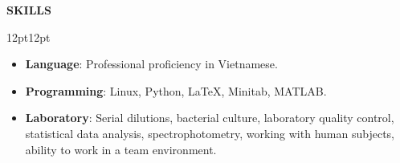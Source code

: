 \documentclass{resumeDaniNguyen}
\begin{document}
\textbf{\large SKILLS} \xrfill[3pt]{1pt} \\[-6pt]
\begin{adjustwidth}{12pt}{12pt}
    \begin{itemize}
        \item \textbf{Language}: Professional proficiency in Vietnamese.
        \item \textbf{Programming}: Linux, Python, LaTeX, Minitab, MATLAB.
        \item \textbf{Laboratory}: Serial dilutions, bacterial culture, laboratory quality control, statistical 
        data analysis, spectrophotometry, working with human subjects, ability to work in a team environment.
    \end{itemize}
\end{adjustwidth}
\end{document}
